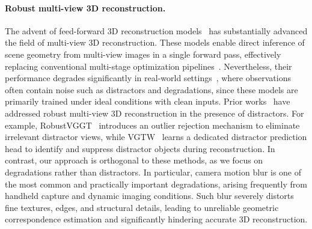 \paragraph{Robust multi-view 3D reconstruction.}
The advent of feed-forward 3D reconstruction models~\cite{wang2024dust3r, leroy2024grounding, wang2025vggt, wang2025pi, depthanything3} has substantially advanced the field of multi-view 3D reconstruction. These models enable direct inference of scene geometry from multi-view images in a single forward pass, effectively replacing conventional multi-stage optimization pipelines~\cite{hartley2003multiple, schonberger2016structure, Schonberger_2016_CVPR, furukawa2010towards, furukawa2015mvs, DeTone_2018_CVPR_Workshops, an2024cross, 4587673, Sun_2021_CVPR}. Nevertheless, their performance degrades significantly in real-world settings~\cite{nah2017deep, rim2020real, malyugina2025unsupervised, liu2024boosting, han2025emergent}, where observations often contain noise such as distractors and degradations, since these models are primarily trained under ideal conditions with clean inputs. Prior works~\cite{han2025emergent, panvisual} have addressed robust multi-view 3D reconstruction in the presence of distractors. For example, RobustVGGT~\cite{han2025emergent} introduces an outlier rejection mechanism to eliminate irrelevant distractor views, while VGTW~\cite{panvisual} learns a dedicated distractor prediction head to identify and suppress distractor objects during reconstruction. In contrast, our approach is orthogonal to these methods, as we focus on degradations rather than distractors. In particular, camera motion blur is one of the most common and practically important degradations, arising frequently from handheld capture and dynamic imaging conditions. Such blur severely distorts fine textures, edges, and structural details, leading to unreliable geometric correspondence estimation and significantly hindering accurate 3D reconstruction.



